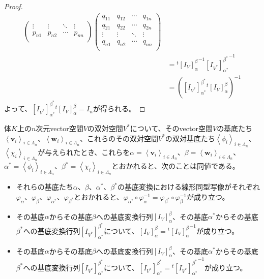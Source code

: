 \documentclass[dvipdfmx]{jsarticle}
\begin{document}
\begin{proof}
\begin{align*}
\begin{pmatrix}
 \vdots & \vdots & \ddots & \vdots \\
p_{n1} & p_{n2} & \cdots & p_{nn} \\
\end{pmatrix}\begin{pmatrix}
q_{11} & q_{12} & \cdots & q_{1n} \\
q_{21} & q_{22} & \cdots & q_{2n} \\
 \vdots & \vdots & \ddots & \vdots \\
q_{n1} & q_{n2} & \cdots & q_{nn} \\
\end{pmatrix}\\
&={}^{t}{\left[ I_{V} \right]^{\beta}_{\alpha}}^{- 1}{\left[ I_{V^{*}} \right]^{\beta^{*}}_{\alpha^{*}}}^{- 1}\\
&= \left( \left[ I_{V^{*}} \right]^{\beta^{*}}_{\alpha^{*}}{}^{t}\left[ I_{V} \right]^{\beta}_{\alpha} \right)^{- 1}
\end{align*}
よって、$\left[ I_{V^{*}} \right]^{\beta^{*}}_{\alpha^{*}}{}^{t}\left[ I_{V} \right]^{\beta}_{\alpha} = I_{n}$が得られる。
\end{proof}
\begin{thm}\label{2.4.3.14}
体$K$上の$n$次元vector空間$V$の双対空間$V^{*}$について、そのvector空間$V$の基底たち$\left\langle \mathbf{v}_{i} \right\rangle_{i \in \varLambda_{n}}$、$\left\langle \mathbf{w}_{i} \right\rangle_{i \in \varLambda_{n}}$、これらのその双対空間$V^{*}$の双対基底たち$\left\langle \phi_{i} \right\rangle_{i \in \varLambda_{n}}$、$\left\langle \chi_{i} \right\rangle_{i \in \varLambda_{n}}$が与えられたとき、これらを$\alpha = \left\langle \mathbf{v}_{i} \right\rangle_{i \in \varLambda_{n}}$、$\beta = \left\langle \mathbf{w}_{i} \right\rangle_{i \in \varLambda_{n}}$、$\alpha^{*} = \left\langle \phi_{i} \right\rangle_{i \in \varLambda_{n}}$、$\beta^{*} = \left\langle \chi_{i} \right\rangle_{i \in \varLambda_{n}}$とおかれると、次のことは同値である。
\begin{itemize}
\item
  それらの基底たち$\alpha$、$\beta$、$\alpha^{*}$、$\beta^{*}$の基底変換における線形同型写像がそれぞれ$\varphi_{\alpha}$、$\varphi_{\beta}$、$\varphi_{\alpha^{*}}$、$\varphi_{\beta^{*}}$とおかれると、$\varphi_{\alpha^{*}} \circ \varphi_{\alpha}^{- 1} = \varphi_{\beta^{*}} \circ \varphi_{\beta}^{- 1}$が成り立つ。
\item
  その基底$\alpha$からその基底$\beta$への基底変換行列$\left[ I_{V} \right]^{\beta}_{\alpha}$、その基底$\alpha^{*}$からその基底$\beta^{*}$への基底変換行列$\left[ I_{V^{*}} \right]^{\beta^{*}}_{\alpha^{*}}$について、$\left[ I_{V} \right]^{\beta}_{\alpha} ={}^{t}{\left[ I_{V} \right]^{\beta}_{\alpha}}^{- 1}$が成り立つ。
\item
  その基底$\alpha$からその基底$\beta$への基底変換行列$\left[ I_{V} \right]^{\beta}_{\alpha}$、その基底$\alpha^{*}$からその基底$\beta^{*}$への基底変換行列$\left[ I_{V^{*}} \right]^{\beta^{*}}_{\alpha^{*}}$について、$\left[ I_{V^{*}} \right]^{\beta^{*}}_{\alpha^{*}} ={}^{t}{\left[ I_{V^{*}} \right]^{\beta^{*}}_{\alpha^{*}}}^{- 1}$が成り立つ。
\end{itemize}
\end{thm}
\end{document}
